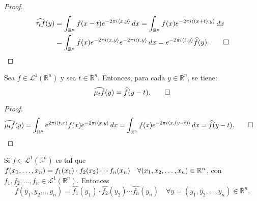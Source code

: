 \begin{proof}
\begin{align*}
        \widehat{\tau_tf}(y) &= \int_{\mathbb{R}^n}f(x-t) e^{-2 \pi i \langle x, y \rangle} \, dx = \int_{\mathbb{R}^n}f(x) e^{-2 \pi i \langle (x+t), y \rangle} \, dx \\ &=  \int_{\mathbb{R}^n}f(x) e^{-2 \pi i \langle x, y \rangle} e^{-2 \pi i \langle t, y \rangle} \, dx = e^{-2 \pi i \langle t, y \rangle}\widehat{f}(y). \qedhere
\end{align*}
\qedhere
\end{proof}


\begin{proposicion}
    Sea $f \in \mathscr{L}^1(\mathbb{R}^n)$ y sea $t \in \mathbb{R}^n$. Entonces, para cada $y \in \mathbb{R}^n$, se tiene:
    \begin{equation*}
        \widehat{\mu_tf}(y) = \widehat{f}(y-t). \qedhere
    \end{equation*}
\end{proposicion}

\begin{proof}
\begin{alignat}{3}
        \widehat{\mu_tf}(y) &= \int_{\mathbb{R}^n}e^{2 \pi i \langle t, x \rangle}f(x) e^{-2 \pi i \langle x, y \rangle} \, dx = \int_{\mathbb{R}^n}f(x) e^{-2 \pi i \langle x, (y-t) \rangle} \, dx   = \widehat{f}(y-t). \qedhere
\end{alignat}
\end{proof}

\begin{proposicion}\label{prop:div}
    Si $f \in \mathscr{L}^1(\mathbb{R}^n)$ 
 es tal que $f(x_1, \ldots, x_n) = f_1(x_1) \cdot f_2(x_2) \cdots f_n(x_n)  
 \\ \quad \forall (x_1,x_2, \ldots, x_n) \in \mathbb{R}^n$, con $f_1,f_2, \ldots, f_n \in \mathscr{L}^1(\mathbb{R}^n)$. Entonces
    \begin{equation}
        \widehat{f}(y_1,y_2 \ldots, y_n) =  \widehat{f_1}(y_1) \cdot \widehat{f_2}(y_2) \cdots \widehat{f_n}(y_n) \quad \forall y = (y_1,y_2, \ldots, y_n) \in \mathbb{R}^n.
    \end{equation}
\end{proposicion}


